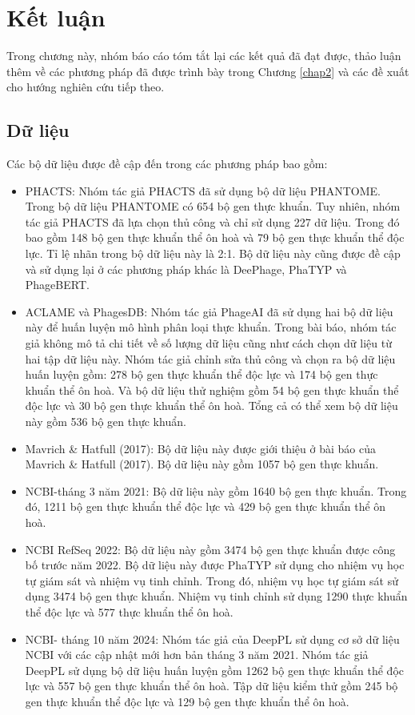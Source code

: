 
\chapter{Kết luận}
Trong chương này, nhóm báo cáo tóm tắt lại các kết quả đã đạt được, thảo luận thêm về các phương pháp đã được trình bày trong Chương \ref{chap2} và các đề xuất cho hướng nghiên cứu tiếp theo.

\section{Dữ liệu}
Các bộ dữ liệu được đề cập đến trong các phương pháp bao gồm:
\begin{itemize}
    \item PHACTS: Nhóm tác giả PHACTS đã sử dụng bộ dữ liệu PHANTOME. Trong bộ dữ liệu PHANTOME có 654 bộ gen thực khuẩn. Tuy nhiên, nhóm tác giả PHACTS đã lựa chọn thủ công và chỉ sử dụng 227 dữ liệu. Trong đó bao gồm 148 bộ gen thực khuẩn thể ôn hoà và 79 bộ gen thực khuẩn thể độc lực. Tỉ lệ nhãn trong bộ dữ liệu này là 2:1. Bộ dữ liệu này cũng được đề cập và sử dụng lại ở các phương pháp khác là DeePhage, PhaTYP và PhageBERT.
    \item ACLAME và PhagesDB: Nhóm tác giả PhageAI đã sử dụng hai bộ dữ liệu này để huấn luyện mô hình phân loại thực khuẩn. Trong bài báo, nhóm tác giả không mô tả chi tiết về số lượng dữ liệu cũng như cách chọn dữ liệu từ hai tập dữ liệu này. Nhóm tác giả chỉnh sửa thủ công và chọn ra bộ dữ liệu huấn luyện gồm: 278 bộ gen thực khuẩn thể độc lực và 174 bộ gen thực khuẩn thể ôn hoà. Và bộ dữ liệu thử nghiệm gồm 54 bộ gen thực khuẩn thể độc lực và 30 bộ gen thực khuẩn thể ôn hoà. Tổng cả có thể xem bộ dữ liệu này gồm 536 bộ gen thực khuẩn.
    \item Mavrich \& Hatfull (2017): Bộ dữ liệu này được giới thiệu ở bài báo của Mavrich \& Hatfull (2017). Bộ dữ liệu này gồm 1057 bộ gen thực khuẩn. 
    \item NCBI-tháng 3 năm 2021: Bộ dữ liệu này gồm 1640 bộ gen thực khuẩn. Trong đó, 1211 bộ gen thực khuẩn thể độc lực và 429 bộ gen thực khuẩn thể ôn hoà. 
    \item NCBI RefSeq 2022: Bộ dữ liệu này gồm 3474 bộ gen thực khuẩn được công bố trước năm 2022. Bộ dữ liệu này được PhaTYP sử dụng cho nhiệm vụ học tự giám sát và nhiệm vụ tinh chỉnh. Trong đó, nhiệm vụ học tự giám sát sử dụng 3474 bộ gen thực khuẩn. Nhiệm vụ tinh chỉnh sử dụng 1290 thực khuẩn thể độc lực và 577 thực khuẩn thể ôn hoà.
    \item NCBI- tháng 10 năm 2024: Nhóm tác giả của DeepPL sử dụng cơ sở dữ liệu NCBI với các cập nhật mới hơn bản tháng 3 năm 2021. Nhóm tác giả DeepPL sử dụng bộ dữ liệu huấn luyện gồm 1262 bộ gen thực khuẩn thể độc lực và 557 bộ gen thực khuẩn thể ôn hoà. Tập dữ liệu kiểm thử gồm 245 bộ gen thực khuẩn thể độc lực và 129 bộ gen thực khuẩn thể ôn hoà. 
\end{itemize}

